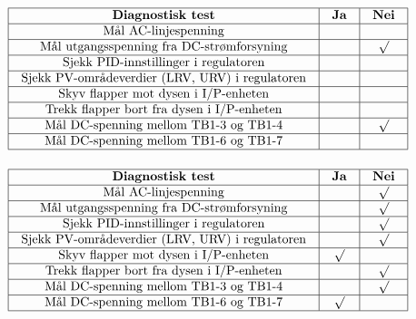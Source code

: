 
$$\vbox{\offinterlineskip
\halign{\strut
\vrule \quad\hfil # \ \hfil & 
\vrule \quad\hfil # \ \hfil & 
\vrule \quad\hfil # \ \hfil \vrule \cr
\noalign{\hrule}
%
{\bf Diagnostisk test} & {\bf Ja} & {\bf Nei} \cr
%
\noalign{\hrule}
%
Mål AC-linjespenning &  &  \cr
%
\noalign{\hrule}
%
Mål utgangsspenning fra DC-strømforsyning &  & $\surd$ \cr
%
\noalign{\hrule}
%
Sjekk PID-innstillinger i regulatoren &  &  \cr
%
\noalign{\hrule}
%
Sjekk PV-områdeverdier (LRV, URV) i regulatoren &  &  \cr
%
\noalign{\hrule}
%
Skyv flapper mot dysen i I/P-enheten &  &  \cr
%
\noalign{\hrule}
%
Trekk flapper bort fra dysen i I/P-enheten &  & \cr
%
\noalign{\hrule}
%
Mål DC-spenning mellom TB1-3 og TB1-4 &  & $\surd$ \cr
%
\noalign{\hrule}
%
Mål DC-spenning mellom TB1-6 og TB1-7 &  &  \cr
%
\noalign{\hrule}
} %
}$$ %








$$\vbox{\offinterlineskip
\halign{\strut
\vrule \quad\hfil # \ \hfil & 
\vrule \quad\hfil # \ \hfil & 
\vrule \quad\hfil # \ \hfil \vrule \cr
\noalign{\hrule}
%
{\bf Diagnostisk test} & {\bf Ja} & {\bf Nei} \cr
%
\noalign{\hrule}
%
Mål AC-linjespenning &  & $\surd$ \cr
%
\noalign{\hrule}
%
Mål utgangsspenning fra DC-strømforsyning &  & $\surd$ \cr
%
\noalign{\hrule}
%
Sjekk PID-innstillinger i regulatoren &  & $\surd$ \cr
%
\noalign{\hrule}
%
Sjekk PV-områdeverdier (LRV, URV) i regulatoren &  & $\surd$ \cr
%
\noalign{\hrule}
%
Skyv flapper mot dysen i I/P-enheten & $\surd$ &  \cr
%
\noalign{\hrule}
%
Trekk flapper bort fra dysen i I/P-enheten &  & $\surd$ \cr
%
\noalign{\hrule}
%
Mål DC-spenning mellom TB1-3 og TB1-4 &  & $\surd$ \cr
%
\noalign{\hrule}
%
Mål DC-spenning mellom TB1-6 og TB1-7 & $\surd$ &  \cr
%
\noalign{\hrule}
} %
}$$ %


\vfil \eject



